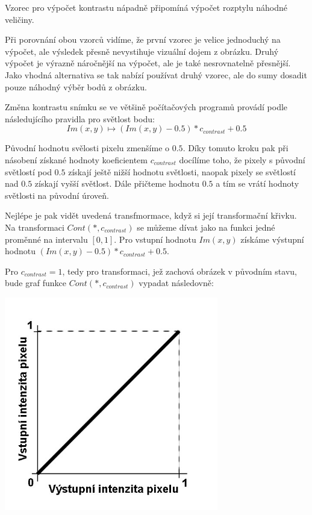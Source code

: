 Vzorec pro výpočet kontrastu nápadně připomíná výpočet rozptylu náhodné veličiny. 

Při porovnání obou vzorců vidíme, že první vzorec je velice jednoduchý na výpočet, ale výsledek přesně nevystihuje vizuální dojem z obrázku. Druhý výpočet je výrazně náročnější na výpočet, ale je také nesrovnatelně přesnější. Jako vhodná alternativa se tak nabízí používat druhý vzorec, ale do sumy dosadit pouze náhodný výběr bodů z obrázku.

Změna kontrastu snímku se ve většině počítačových programů provádí podle následujícího pravidla pro světlost bodu:
\[
  Im(x,y) \longmapsto   (Im(x,y) - 0.5)*c_{contrast} + 0.5
\]

Původní hodnotu svělosti pixelu zmenšíme o $0.5$. Díky tomuto kroku pak při násobení získané hodnoty koeficientem $c_{contrast}$ docílíme toho, že pixely s původní světlostí pod $0.5$ získají ještě nižší hodnotu světlosti, naopak pixely se světlostí nad $0.5$ získají vyšší světlost. Dále přičteme hodnotu $0.5$ a tím se vrátí hodnoty světlosti na původní úroveň.

Nejlépe je pak vidět uvedená transfmormace, když si její transformační křivku. Na transformaci $ Cont(*,c_{contrast}) $ se můžeme dívat jako na funkci jedné proměnné na intervalu $[0,1]$. Pro vstupní hodnotu $ Im(x,y) $ získáme výstupní hodnotu $ (Im(x,y) - 0.5)*c_{contrast} + 0.5 $.

Pro $ c_{contrast}=1 $, tedy pro transformaci, jež zachová obrázek v původním stavu, bude graf funkce $ Cont(*,c_{contrast}) $ vypadat následovně:

\includegraphics[width=0.7\textwidth,height=0.7\textwidth]{Text/IMG/Kontrast_Identita.jpg}

